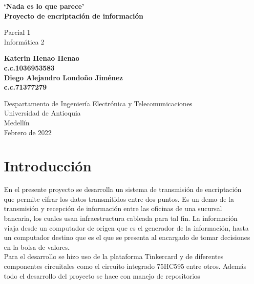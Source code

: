 \documentclass{article}
\begin{document}
\begin{titlepage}
    \begin{center}
        \vspace*{2cm}
            
        \Huge
        \textbf{`Nada es lo que parece' \\
        Proyecto de encriptación de información}
            
        \vspace{0.5cm}
        \LARGE
        Parcial 1\\
        Informática 2

        
            
        \vspace{2,5cm}
            
        \textbf{
        Katerin Henao Henao\\
        c.c.1036953583\\
        Diego Alejandro Londoño Jiménez\\
        c.c.71377279\\
        }
            
        \vfill
            
        \vspace{2,5cm}
            
        \Large
        Despartamento de Ingeniería Electrónica y Telecomunicaciones\\
        Universidad de Antioquia\\
        Medellín\\
        Febrero de 2022
            
    \end{center}
\end{titlepage}

\tableofcontents
\newpage
\section{Introducción}
\label{intro}
En el presente proyecto se desarrolla un sistema de transmisión de encriptación que permite cifrar los datos transmitidos entre dos puntos. Es un demo de la transmisión y recepción de información entre las oficinas de una sucursal bancaria, los cuales usan infraestructura cableada para tal fin. La información viaja desde un computador de origen que es el generador de la información, hasta un computador destino que es el que se presenta al encargado de tomar decisiones en la bolsa de valores. \\
Para el desarrollo se hizo uso de la plataforma Tinkercard y de diferentes componentes circuitales como el circuito integrado 75HC595 entre otros. Además todo el desarrollo del proyecto se hace con manejo de repositorios
\end{document}
